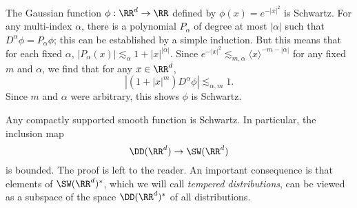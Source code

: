 \begin{example}
    The Gaussian function $\phi: \RR^d \to \RR$ defined by $\phi(x) = e^{-|x|^2}$ is Schwartz. For any multi-index $\alpha$, there is a polynomial $P_\alpha$ of degree at most $|\alpha|$ such that $D^\alpha \phi = P_\alpha \phi$; this can be established by a simple induction. But this means that for each fixed $\alpha$, $|P_\alpha(x)| \lesssim_\alpha 1 + |x|^{|\alpha|}$. Since $e^{-|x|^2} \lesssim_{m,\alpha} \langle x \rangle^{-m -|\alpha|}$ for any fixed $m$ and $\alpha$, we find that for any $x \in \RR^d$,
    \[ | (1 + |x|^m) D^\alpha \phi| \lesssim_{\alpha,m} 1. \]
    Since $m$ and $\alpha$ were arbitrary, this shows $\phi$ is Schwartz.
\end{example}

\begin{example}
    Any compactly supported smooth function is Schwartz. In particular, the inclusion map
    \[ \DD(\RR^d) \to \SW(\RR^d) \]
    is bounded. The proof is left to the reader. An important consequence is that elements of $\SW(\RR^d)^*$, which we will call \emph{tempered distributions}, can be viewed as a subspace of the space $\DD(\RR^d)^*$ of all distributions.
\end{example} 

